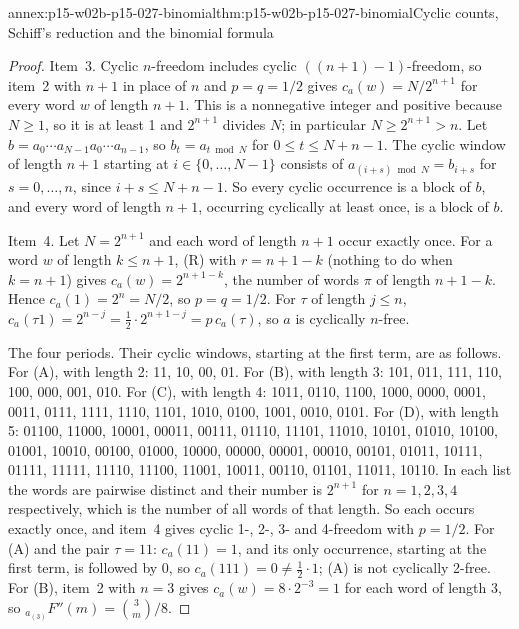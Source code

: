 \begin{annexitem}{annex:p15-w02b-p15-027-binomial}{thm:p15-w02b-p15-027-binomial}{Cyclic counts, Schiff's reduction and the binomial formula}
\begin{proof}
Item~3. Cyclic \(n\)-freedom includes cyclic \(((n+1)-1)\)-freedom, so
item~2 with \(n+1\) in place of \(n\) and \(p=q=1/2\) gives
\(c_a(w)=N/2^{n+1}\) for every word \(w\) of length \(n+1\). This is a
nonnegative integer and positive because \(N\geq1\), so it is at least 1
and \(2^{n+1}\) divides \(N\); in particular \(N\geq2^{n+1}>n\). Let
\(b=a_0\cdots a_{N-1}a_0\cdots a_{n-1}\), so \(b_t=a_{t\bmod N}\) for
\(0\leq t\leq N+n-1\). The cyclic window of length \(n+1\) starting at
\(i\in\{0,\ldots,N-1\}\) consists of \(a_{(i+s)\bmod N}=b_{i+s}\) for
\(s=0,\ldots,n\), since \(i+s\leq N+n-1\). So every cyclic occurrence is
a block of \(b\), and every word of length \(n+1\), occurring cyclically
at least once, is a block of \(b\).

Item~4. Let \(N=2^{n+1}\) and each word of length \(n+1\) occur exactly
once. For a word \(w\) of length \(k\leq n+1\), (R) with \(r=n+1-k\)
(nothing to do when \(k=n+1\)) gives \(c_a(w)=2^{n+1-k}\), the number
of words \(\pi\) of length \(n+1-k\). Hence \(c_a(1)=2^n=N/2\), so
\(p=q=1/2\). For \(\tau\) of length \(j\leq n\),
\(c_a(\tau1)=2^{n-j}=\tfrac12\cdot2^{n+1-j}=p\,c_a(\tau)\), so \(a\) is
cyclically \(n\)-free.

The four periods. Their cyclic windows, starting at the first term, are
as follows. For (A), with length 2: 11, 10, 00, 01. For (B), with
length 3: 101, 011, 111, 110, 100, 000, 001, 010. For (C), with
length 4: 1011, 0110, 1100, 1000, 0000, 0001, 0011, 0111, 1111, 1110,
1101, 1010, 0100, 1001, 0010, 0101. For (D), with length 5: 01100,
11000, 10001, 00011, 00111, 01110, 11101, 11010, 10101, 01010, 10100,
01001, 10010, 00100, 01000, 10000, 00000, 00001, 00010, 00101, 01011,
10111, 01111, 11111, 11110, 11100, 11001, 10011, 00110, 01101, 11011,
10110.
In each list the words are pairwise distinct and their number is
\(2^{n+1}\) for \(n=1,2,3,4\) respectively, which is the number of all
words of that length. So each occurs exactly once, and item~4 gives
cyclic 1-, 2-, 3- and 4-freedom with \(p=1/2\). For (A) and the pair
\(\tau=11\): \(c_a(11)=1\), and its only occurrence, starting at the
first term, is followed by \(0\), so \(c_a(111)=0\neq\tfrac12\cdot1\);
(A) is not cyclically 2-free. For (B), item~2 with \(n=3\) gives
\(c_a(w)=8\cdot2^{-3}=1\) for each word of length 3, so
\({}_{a_{(3)}}F''(m)=\binom3m/8\).
\end{proof}
\end{annexitem}

